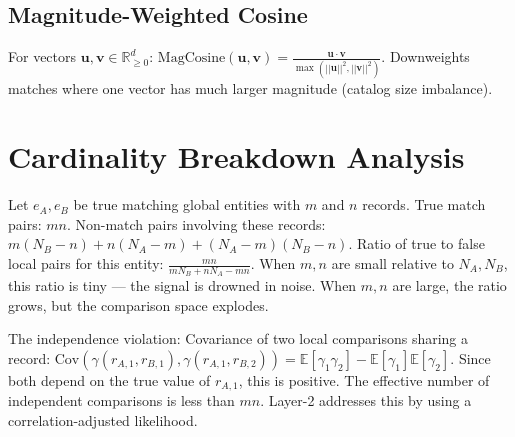 \subsection{Magnitude-Weighted Cosine}
For vectors $\mathbf{u}, \mathbf{v} \in \mathbb{R}^d_{\ge 0}$:
$\text{MagCosine}(\mathbf{u}, \mathbf{v}) = \frac{\mathbf{u} \cdot \mathbf{v}}{\max(||\mathbf{u}||^2, ||\mathbf{v}||^2)}$.
Downweights matches where one vector has much larger magnitude (catalog size imbalance).

\section{Cardinality Breakdown Analysis}
\label{annex:cardinality_math}

Let $e_A, e_B$ be true matching global entities with $m$ and $n$ records.
True match pairs: $mn$.
Non-match pairs involving these records: $m(N_B - n) + n(N_A - m) + (N_A - m)(N_B - n)$.
Ratio of true to false local pairs for this entity: $\frac{mn}{m N_B + n N_A - mn}$.
When $m,n$ are small relative to $N_A, N_B$, this ratio is tiny — the signal is drowned in noise.
When $m,n$ are large, the ratio grows, but the comparison space explodes.

The independence violation:
Covariance of two local comparisons sharing a record:
$\text{Cov}(\gamma(r_{A,1}, r_{B,1}), \gamma(r_{A,1}, r_{B,2})) = \mathbb{E}[\gamma_1 \gamma_2] - \mathbb{E}[\gamma_1]\mathbb{E}[\gamma_2]$.
Since both depend on the true value of $r_{A,1}$, this is positive.
The effective number of independent comparisons is less than $mn$.
Layer-2 addresses this by using a correlation-adjusted likelihood.